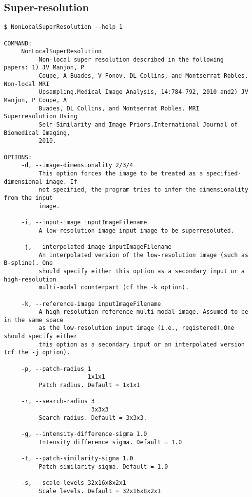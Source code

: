 \documentclass{InsightArticle}
\begin{document}
\subsection{Super-resolution}

\small
\begin{verbatim}
$ NonLocalSuperResolution --help 1

COMMAND:
     NonLocalSuperResolution
          Non-local super resolution described in the following papers: 1) JV Manjon, P
          Coupe, A Buades, V Fonov, DL Collins, and Montserrat Robles. Non-local MRI
          Upsampling.Medical Image Analysis, 14:784-792, 2010 and2) JV Manjon, P Coupe, A
          Buades, DL Collins, and Montserrat Robles. MRI Superresolution Using
          Self-Similarity and Image Priors.International Journal of Biomedical Imaging,
          2010.

OPTIONS:
     -d, --image-dimensionality 2/3/4
          This option forces the image to be treated as a specified-dimensional image. If
          not specified, the program tries to infer the dimensionality from the input
          image.

     -i, --input-image inputImageFilename
          A low-resolution image input image to be superresoluted.

     -j, --interpolated-image inputImageFilename
          An interpolated version of the low-resolution image (such as B-spline). One
          should specify either this option as a secondary input or a high-resolution
          multi-modal counterpart (cf the -k option).

     -k, --reference-image inputImageFilename
          A high resolution reference multi-modal image. Assumed to be in the same space
          as the low-resolution input image (i.e., registered).One should specify either
          this option as a secondary input or an interpolated version (cf the -j option).

     -p, --patch-radius 1
                        1x1x1
          Patch radius. Default = 1x1x1

     -r, --search-radius 3
                         3x3x3
          Search radius. Default = 3x3x3.

     -g, --intensity-difference-sigma 1.0
          Intensity difference sigma. Default = 1.0

     -t, --patch-similarity-sigma 1.0
          Patch similarity sigma. Default = 1.0

     -s, --scale-levels 32x16x8x2x1
          Scale levels. Default = 32x16x8x2x1


\end{verbatim}
\end{document}

